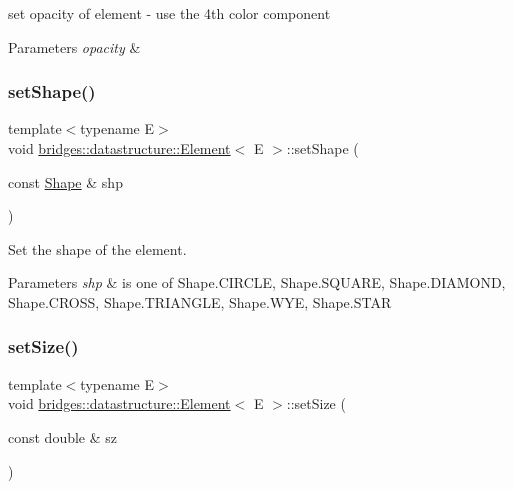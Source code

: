 set opacity of element -\/ use the 4th color component


\begin{DoxyParams}{Parameters}
{\em opacity} & \\
\hline
\end{DoxyParams}
\mbox{\label{classbridges_1_1datastructure_1_1_element_a1ef398bf1027244a624575e58a569ed9}} 
\subsubsection{\texorpdfstring{setShape()}{setShape()}}
{\footnotesize\ttfamily template$<$typename E$>$ \\
void \mbox{\hyperlink{classbridges_1_1datastructure_1_1_element}{bridges\+::datastructure\+::\+Element}}$<$ E $>$\+::set\+Shape (\begin{DoxyParamCaption}\item[{const \mbox{\hyperlink{namespacebridges_1_1datastructure_a3408f5f44d9c6062e5f3adb7e1bbb7f0}{Shape}} \&}]{shp }\end{DoxyParamCaption})\hspace{0.3cm}{\ttfamily [inline]}}



Set the shape of the element. 


\begin{DoxyParams}{Parameters}
{\em shp} & is one of Shape.\+C\+I\+R\+C\+LE, Shape.\+S\+Q\+U\+A\+RE, Shape.\+D\+I\+A\+M\+O\+ND, Shape.\+C\+R\+O\+SS, Shape.\+T\+R\+I\+A\+N\+G\+LE, Shape.\+W\+YE, Shape.\+S\+T\+AR \\
\hline
\end{DoxyParams}
\mbox{\label{classbridges_1_1datastructure_1_1_element_a3200b0ac712c1720db62d1f0bbcb14be}} 
\subsubsection{\texorpdfstring{setSize()}{setSize()}}
{\footnotesize\ttfamily template$<$typename E$>$ \\
void \mbox{\hyperlink{classbridges_1_1datastructure_1_1_element}{bridges\+::datastructure\+::\+Element}}$<$ E $>$\+::set\+Size (\begin{DoxyParamCaption}\item[{const double \&}]{sz }\end{DoxyParamCaption})\hspace{0.3cm}{\ttfamily [inline]}}



